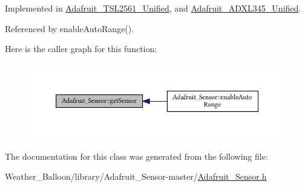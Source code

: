 Implemented in \hyperlink{class_adafruit___t_s_l2561___unified_a4c8dcb86a371558aba4ddb0a740d9b3c}{Adafruit\+\_\+\+T\+S\+L2561\+\_\+\+Unified}, and \hyperlink{class_adafruit___a_d_x_l345___unified_ac53068bb82bd03fc492542b468a30478}{Adafruit\+\_\+\+A\+D\+X\+L345\+\_\+\+Unified}.



Referenced by enable\+Auto\+Range().



Here is the caller graph for this function\+:\nopagebreak
\begin{figure}[H]
\begin{center}
\leavevmode
\includegraphics[width=350pt]{class_adafruit___sensor_a19e844c1eb2dc37cb72705d5572c4676_icgraph}
\end{center}
\end{figure}




The documentation for this class was generated from the following file\+:\begin{DoxyCompactItemize}
\item 
Weather\+\_\+\+Balloon/library/\+Adafruit\+\_\+\+Sensor-\/master/\hyperlink{_adafruit___sensor_8h}{Adafruit\+\_\+\+Sensor.\+h}\end{DoxyCompactItemize}
